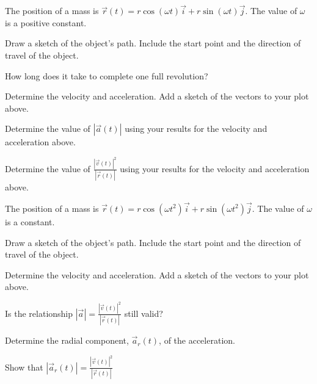\begin{problem}
%

\item The position of a mass is
  $\vec{r}(t)=r\cos(\omega t)\vec{i}+r\sin(\omega t)\vec{j}$. The
  value of $\omega$ is a positive constant.
  \begin{subproblem}
  \item Draw a sketch of the object's path. Include the start point
    and the direction of travel of the object.
    \vfill
  \item How long does it take to complete one full revolution?
    \vspace{3em}
  \item Determine the velocity and acceleration. Add a sketch of the
    vectors to your plot above.
    \vfill
    \clearpage
  \item Determine the value of $|\vec{a}(t)|$ using your results for
    the velocity and acceleration above.
    \vfill
  \item Determine the value of $\frac{|\vec{v}(t)|^2}{|\vec{r}(t)|}$
    using your results for the velocity and acceleration above.
    \vfill
  \end{subproblem}

\end{problem}

\begin{problem}
\item The position of a mass is
  $\vec{r}(t)=r\cos(\omega t^2)\vec{i}+r\sin(\omega t^2)\vec{j}$. The
  value of $\omega$ is a constant.
  \begin{subproblem}
  \item Draw a sketch of the object's path. Include the start point
    and the direction of travel of the object.
    \vfill
  \item Determine the velocity and acceleration. Add a sketch of the
    vectors to your plot above.
    \vfill
    \clearpage
  \item Is the relationship $|\vec{a}|=\frac{|\vec{v}(t)|^2}{|\vec{r}(t)|}$
    still valid?
    \vfill
    \vfill
  \item Determine the radial component, $\vec{a}_r(t)$, of the
    acceleration.
    \vfill
  \item Show that $|\vec{a}_r(t)| = \frac{|\vec{v}(t)|^2}{|\vec{r}(t)|}$
    \vfill
  \end{subproblem}
\end{problem}

